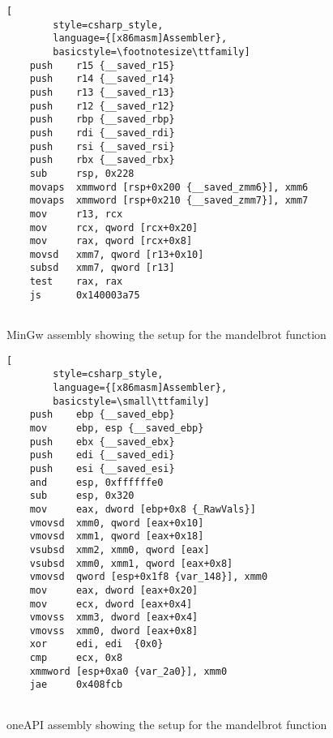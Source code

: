 \begin{figure}[ht]
    \begin{minipage}[b]{0.5\linewidth}
    \begin{lstlisting}[
        style=csharp_style,
        language={[x86masm]Assembler},
        basicstyle=\footnotesize\ttfamily]
    push    r15 {__saved_r15}
    push    r14 {__saved_r14}
    push    r13 {__saved_r13}
    push    r12 {__saved_r12}
    push    rbp {__saved_rbp}
    push    rdi {__saved_rdi}
    push    rsi {__saved_rsi}
    push    rbx {__saved_rbx}
    sub     rsp, 0x228
    movaps  xmmword [rsp+0x200 {__saved_zmm6}], xmm6
    movaps  xmmword [rsp+0x210 {__saved_zmm7}], xmm7
    mov     r13, rcx
    mov     rcx, qword [rcx+0x20]
    mov     rax, qword [rcx+0x8]
    movsd   xmm7, qword [r13+0x10]
    subsd   xmm7, qword [r13]
    test    rax, rax
    js      0x140003a75
        
    \end{lstlisting}
    \caption{MinGw assembly showing the setup for the mandelbrot function}
    \label{fig:assembly1}
    \end{minipage}
    \hspace{0.5cm}
    \begin{minipage}[b]{0.5\linewidth}
    \begin{lstlisting}[
        style=csharp_style,
        language={[x86masm]Assembler},
        basicstyle=\small\ttfamily]
    push    ebp {__saved_ebp}
    mov     ebp, esp {__saved_ebp}
    push    ebx {__saved_ebx}
    push    edi {__saved_edi}
    push    esi {__saved_esi}
    and     esp, 0xffffffe0
    sub     esp, 0x320
    mov     eax, dword [ebp+0x8 {_RawVals}]
    vmovsd  xmm0, qword [eax+0x10]
    vmovsd  xmm1, qword [eax+0x18]
    vsubsd  xmm2, xmm0, qword [eax]
    vsubsd  xmm0, xmm1, qword [eax+0x8]
    vmovsd  qword [esp+0x1f8 {var_148}], xmm0
    mov     eax, dword [eax+0x20]
    mov     ecx, dword [eax+0x4]
    vmovss  xmm3, dword [eax+0x4]
    vmovss  xmm0, dword [eax+0x8]
    xor     edi, edi  {0x0}
    cmp     ecx, 0x8
    xmmword [esp+0xa0 {var_2a0}], xmm0
    jae     0x408fcb
        
    \end{lstlisting}
    \caption{oneAPI assembly showing the setup for the mandelbrot function}
    \label{fig:assembly2}
    \end{minipage}
    \end{figure}

